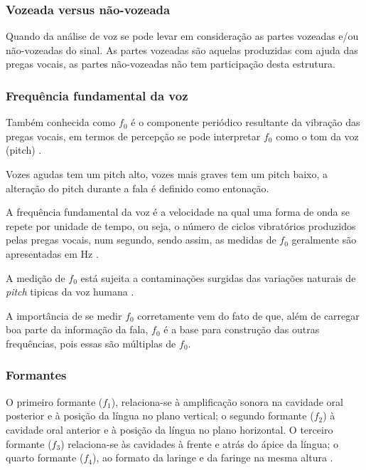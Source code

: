 			\subsubsection{Vozeada versus não-vozeada}

			\par Quando da análise de voz se pode levar em consideração as partes vozeadas e/ou não-vozeadas do sinal. As partes vozeadas são aquelas produzidas com ajuda das pregas vocais, as partes não-vozeadas não tem participação desta estrutura.
			
			\subsubsection{Frequência fundamental da voz}
				\par Também conhecida como $f_0$ é o componente periódico resultante da vibração das pregas vocais, em termos de percepção se pode interpretar $f_0$ como o tom da voz (pitch) \cite{kremer2014eficiencia}.
			
				\par Vozes agudas tem um pitch alto, vozes mais graves tem um pitch baixo, a alteração do pitch durante a fala é definido como entonação.
				
				\par A frequência fundamental da voz é a velocidade na qual uma forma de onda se repete
				por unidade de tempo, ou seja, o número de ciclos vibratórios produzidos pelas pregas vocais, num segundo, sendo assim, as medidas de $f_0$ geralmente são apresentadas em Hz \cite{freitas2013avaliaccao}.
			
				\par A medição de $f_0$ está sujeita a contaminações surgidas das variações naturais de \textit{pitch} tipicas da voz humana \cite{freitas2013avaliaccao}.
				
				\par A importância de se medir $f_0$ corretamente vem do fato de que, além de carregar boa parte da informação da fala, $f_0$ é a base para construção das outras frequências, pois essas são múltiplas de $f_0$.
				
				\subsubsection{Formantes}
				
				\begin{citacao}
					\par O primeiro formante ($f_1$), relaciona-se à  amplificação  sonora  na  cavidade  oral  posterior  e  à  posição  da  língua  no  plano  vertical;  o segundo  formante  ($f_2$)  à  cavidade  oral  anterior  e  à  posição  da  língua  no  plano  horizontal.  O terceiro  formante  ($f_3$)  relaciona-se  às  cavidades  à  frente  e  atrás  do  ápice  da  língua;  o  quarto formante  ($f_4$),  ao  formato  da  laringe  e  da  faringe  na  mesma  altura  \cite{valencca2014analise}.
				\end{citacao}

